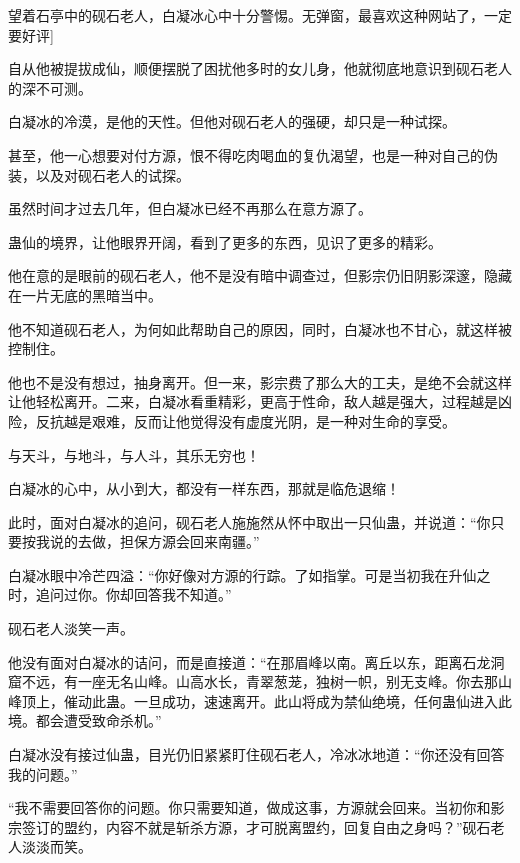 
\begin{this_body}



望着石亭中的砚石老人，白凝冰心中十分警惕。无弹窗，最喜欢这种网站了，一定要好评]

自从他被提拔成仙，顺便摆脱了困扰他多时的女儿身，他就彻底地意识到砚石老人的深不可测。

白凝冰的冷漠，是他的天性。但他对砚石老人的强硬，却只是一种试探。

甚至，他一心想要对付方源，恨不得吃肉喝血的复仇渴望，也是一种对自己的伪装，以及对砚石老人的试探。

虽然时间才过去几年，但白凝冰已经不再那么在意方源了。

蛊仙的境界，让他眼界开阔，看到了更多的东西，见识了更多的精彩。

他在意的是眼前的砚石老人，他不是没有暗中调查过，但影宗仍旧阴影深邃，隐藏在一片无底的黑暗当中。

他不知道砚石老人，为何如此帮助自己的原因，同时，白凝冰也不甘心，就这样被控制住。

他也不是没有想过，抽身离开。但一来，影宗费了那么大的工夫，是绝不会就这样让他轻松离开。二来，白凝冰看重精彩，更高于性命，敌人越是强大，过程越是凶险，反抗越是艰难，反而让他觉得没有虚度光阴，是一种对生命的享受。

与天斗，与地斗，与人斗，其乐无穷也！

白凝冰的心中，从小到大，都没有一样东西，那就是临危退缩！

此时，面对白凝冰的追问，砚石老人施施然从怀中取出一只仙蛊，并说道：“你只要按我说的去做，担保方源会回来南疆。”

白凝冰眼中冷芒四溢：“你好像对方源的行踪。了如指掌。可是当初我在升仙之时，追问过你。你却回答我不知道。”

砚石老人淡笑一声。

他没有面对白凝冰的诘问，而是直接道：“在那眉峰以南。离丘以东，距离石龙洞窟不远，有一座无名山峰。山高水长，青翠葱茏，独树一帜，别无支峰。你去那山峰顶上，催动此蛊。一旦成功，速速离开。此山将成为禁仙绝境，任何蛊仙进入此境。都会遭受致命杀机。”

白凝冰没有接过仙蛊，目光仍旧紧紧盯住砚石老人，冷冰冰地道：“你还没有回答我的问题。”

“我不需要回答你的问题。你只需要知道，做成这事，方源就会回来。当初你和影宗签订的盟约，内容不就是斩杀方源，才可脱离盟约，回复自由之身吗？”砚石老人淡淡而笑。


\end{this_body}
